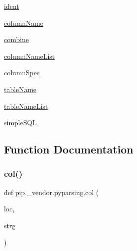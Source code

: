 \begin{DoxyCompactItemize}
\item 
\hyperlink{namespacepip_1_1__vendor_1_1pyparsing_a3560e2f3403f0887502a06ba733ce712}{ident}
\item 
\hyperlink{namespacepip_1_1__vendor_1_1pyparsing_a373b3f03ded9d058bcddf269d6f1fb79}{column\+Name}
\item 
\hyperlink{namespacepip_1_1__vendor_1_1pyparsing_a71819683fa9a182ac71e85c595994724}{combine}
\item 
\hyperlink{namespacepip_1_1__vendor_1_1pyparsing_afa5952d913ffd74e288465d0103aae08}{column\+Name\+List}
\item 
\hyperlink{namespacepip_1_1__vendor_1_1pyparsing_a3cd6447f67d65163d477eca2a9f12496}{column\+Spec}
\item 
\hyperlink{namespacepip_1_1__vendor_1_1pyparsing_a638215be4a5c9cf2b4f76b5a56f76f2c}{table\+Name}
\item 
\hyperlink{namespacepip_1_1__vendor_1_1pyparsing_af93c99969a206b2f570d4c38956978b4}{table\+Name\+List}
\item 
\hyperlink{namespacepip_1_1__vendor_1_1pyparsing_a9fced62ea8338dd9cb911339b278e39a}{simple\+S\+QL}
\end{DoxyCompactItemize}


\subsection{Function Documentation}
\mbox{\label{namespacepip_1_1__vendor_1_1pyparsing_a2c6cb653b8a52ff379699c1d5042839b}} 
\subsubsection{\texorpdfstring{col()}{col()}}
{\footnotesize\ttfamily def pip.\+\_\+vendor.\+pyparsing.\+col (\begin{DoxyParamCaption}\item[{}]{loc,  }\item[{}]{strg }\end{DoxyParamCaption})}

